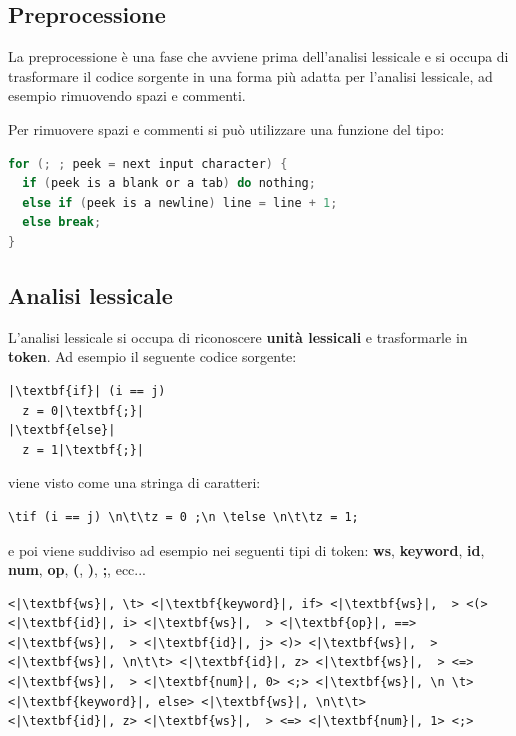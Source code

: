 \documentclass[a4paper]{article}
\begin{document}
\subsection{Preprocessione}
La preprocessione è una fase che avviene prima dell'analisi lessicale e si occupa di
trasformare il codice sorgente in una forma più adatta per l'analisi lessicale, ad esempio
rimuovendo spazi e commenti.
\begin{example}
  Per rimuovere spazi e commenti si può utilizzare una funzione del tipo:
\begin{lstlisting}[language=C]
for (; ; peek = next input character) {
  if (peek is a blank or a tab) do nothing;
  else if (peek is a newline) line = line + 1;
  else break;
}
\end{lstlisting}
\end{example}

\subsection{Analisi lessicale}
L'analisi lessicale si occupa di riconoscere \textbf{unità lessicali} e trasformarle
in \textbf{token}. Ad esempio il seguente codice sorgente:
\begin{lstlisting}[escapechar=|, basicstyle=\rmfamily, columns=fullflexible, keepspaces=true]
|\textbf{if}| (i == j)
  z = 0|\textbf{;}|
|\textbf{else}|
  z = 1|\textbf{;}|
\end{lstlisting}
viene visto come una stringa di caratteri:
\begin{lstlisting}[numbers=none]
\tif (i == j) \n\t\tz = 0 ;\n \telse \n\t\tz = 1;
\end{lstlisting}
e poi viene suddiviso ad esempio nei seguenti tipi di token: \textbf{ws},
\textbf{keyword}, \textbf{id}, \textbf{num}, \textbf{op}, \textbf{(}, \textbf{)},
\textbf{;}, ecc...
\begin{lstlisting}[escapechar=|, basicstyle=\rmfamily, columns=fullflexible, keepspaces=true]
<|\textbf{ws}|, \t> <|\textbf{keyword}|, if> <|\textbf{ws}|,  > <(> <|\textbf{id}|, i> <|\textbf{ws}|,  > <|\textbf{op}|, ==>
<|\textbf{ws}|,  > <|\textbf{id}|, j> <)> <|\textbf{ws}|,  > <|\textbf{ws}|, \n\t\t> <|\textbf{id}|, z> <|\textbf{ws}|,  > <=>
<|\textbf{ws}|,  > <|\textbf{num}|, 0> <;> <|\textbf{ws}|, \n \t> <|\textbf{keyword}|, else> <|\textbf{ws}|, \n\t\t>
<|\textbf{id}|, z> <|\textbf{ws}|,  > <=> <|\textbf{num}|, 1> <;>
\end{lstlisting}
\end{document}
